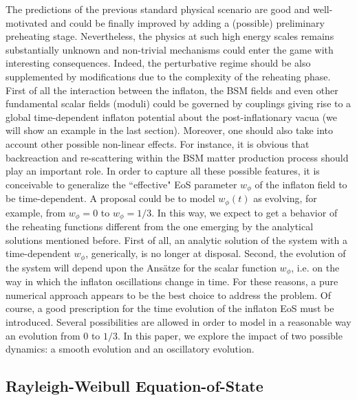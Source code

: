 \documentclass[%
aps,prd,nofootinbib,showkeys,a4paper,10pt
]{revtex4-2}
\begin{document}
The predictions of the previous standard physical scenario are good and well-motivated and 
could be finally improved by adding a (possible) preliminary preheating stage.
Nevertheless, the physics at such high energy scales remains substantially unknown 
and non-trivial mechanisms could enter the game with interesting consequences.  
Indeed, the perturbative regime should be also supplemented by modifications due to the complexity of the reheating phase. 
First of all the interaction between the inflaton, the BSM fields and even other fundamental scalar fields (moduli) could be governed by couplings
giving rise to a global time-dependent inflaton potential about the post-inflationary vacua (we will show an example in the last section).
Moreover, one should also take into account other possible non-linear effects.
For instance, it is obvious that backreaction and re-scattering within the BSM matter production process should play an important role.
In order to capture all these possible features, it is conceivable to generalize the  ``effective" EoS parameter $w_{\phi}$ of the inflaton field to be time-dependent.
A proposal could be to model $w_{\phi}(t)$ as evolving, for example, from $w_{\phi}=0$ to $w_{\phi}=1/3$.  
In this way, we expect to get a behavior of the reheating functions different from the one emerging by the analytical solutions mentioned before.  
First of all, an analytic solution of the system with a time-dependent $w_{\phi}$, generically, is no longer at disposal. 
Second, the evolution of the system will depend upon the Ans\"atze for the scalar function $w_{\phi}$, 
i.e. on the way in which the inflaton oscillations change in time.
For these reasons, a pure numerical approach appears to be the best choice to address the problem.  
Of course, a good prescription for the time evolution of the inflaton EoS must be introduced.
Several possibilities are allowed in order to model in a reasonable way an evolution from $0$ to $1/3$.  
In this paper, we explore the impact of two possible dynamics: a smooth evolution and an oscillatory evolution.




\subsection{Rayleigh-Weibull Equation-of-State}
\end{document}
